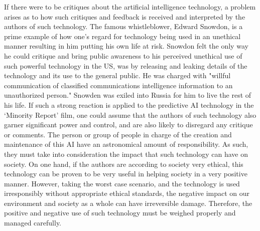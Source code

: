 \documentclass{article}
\begin{document}
If there were to be critiques about the artificial intelligence technology, a problem arises as to how such critiques and feedback is received and interpreted by the authors of such technology.  The famous whistleblower, Edward Snowdon, is a prime example of how one’s regard for technology being used in an unethical manner resulting in him putting his own life at risk.  Snowdon felt the only way he could critique and bring public awareness to his perceived unethical use of such powerful technology in the US, was by releasing and leaking details of the technology and its use to the general public. He was charged with "willful communication of classified communications intelligence information to an unauthorized person." \cite{biography.com_2019} Snowden was exiled into Russia for him to live the rest of his life. If such a strong reaction is applied to the predictive AI technology in the ‘Minority Report’ film, one could assume that the authors of such technology also garner significant power and control, and are also likely to disregard any critique or comments.  The person or group of people in charge of the creation and maintenance of this AI have an astronomical amount of responsibility.  As such, they must take into consideration the impact that such technology can have on society. On one hand, if the authors are according to society very ethical, this technology can be proven to be very useful in helping society in a very positive manner.  However, taking the worst case scenario, and the technology is used irresponsibly without appropriate ethical standards, the negative impact on our environment and society as a whole can have irreversible damage. Therefore, the positive and negative use of such technology must be weighed properly and managed carefully.
\end{document}
